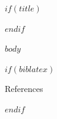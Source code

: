 \documentclass[$if(fontsize)$$fontsize$$else$11pt$endif$]{beamer}
\begin{document}
$if(title)$\begin{frame}\titlepage\end{frame}$endif$

$body$

$if(biblatex)$
\begin{frame}[allowframebreaks]{References}
\printbibliography
\end{frame}
$endif$
\end{document}
